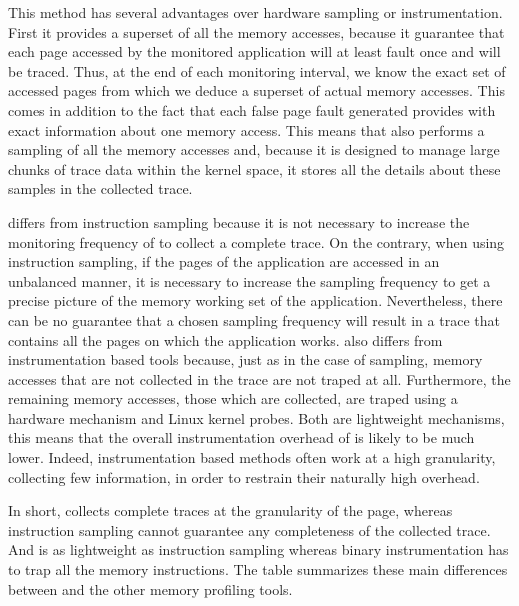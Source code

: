 This method has several advantages over hardware sampling or
instrumentation. First it provides a superset of all the memory accesses, because it
guarantee that each page accessed by the monitored application will at least fault once
and will be traced. Thus, at the end of each monitoring interval, we know the exact set
of accessed pages from which we deduce a superset of actual memory accesses.
This comes in addition to the fact that each false page fault generated provides \Moca with
exact information about one memory access. This means that \Moca also performs a sampling
of all the memory accesses and, because it is designed to manage large chunks of trace data
within the kernel space, it stores all the details about these samples in the collected trace.

\Moca differs from instruction sampling because it is not necessary to increase the monitoring
frequency of \Moca to collect a complete trace. On the contrary, when using instruction sampling,
if the pages of the application are accessed in an unbalanced manner, it is necessary to increase
the sampling frequency to get a precise picture of the memory working set of the application.
Nevertheless, there can be no guarantee that a chosen sampling frequency will result in a trace
that contains all the pages on which the application works.
\Moca also differs from instrumentation based tools because, just as in the case of sampling,
memory accesses that are not collected in the trace are not traped at all. Furthermore, the
remaining memory accesses, those which are collected, are traped using a hardware mechanism and
Linux kernel probes. Both are lightweight mechanisms, this means that
the overall instrumentation overhead of \Moca is likely to be much lower.
Indeed, instrumentation based methods often work at a high granularity, collecting few information,
in order to restrain their naturally high overhead.

In short, \Moca collects complete traces at the granularity of the page, whereas instruction
sampling cannot guarantee any completeness of the collected trace. And \Moca is as lightweight
as instruction sampling whereas binary instrumentation has to trap all the memory instructions.
The table  summarizes these main differences between \Moca and the other memory profiling tools.

